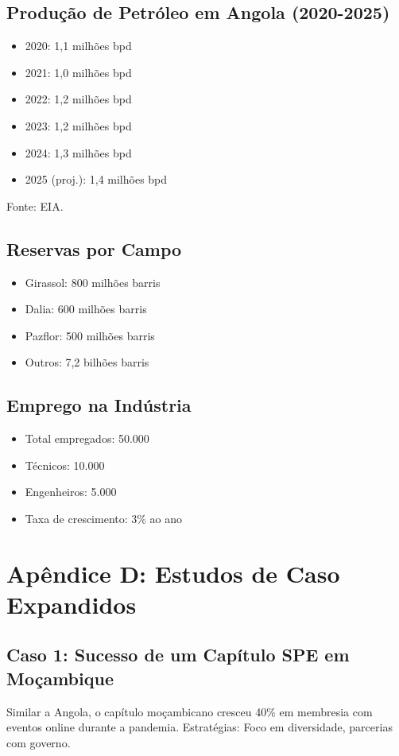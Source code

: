 \documentclass[12pt]{article}
\begin{document}
\subsection{Produção de Petróleo em Angola (2020-2025)}
\begin{itemize}
    \item 2020: 1,1 milhões bpd
    \item 2021: 1,0 milhões bpd
    \item 2022: 1,2 milhões bpd
    \item 2023: 1,2 milhões bpd
    \item 2024: 1,3 milhões bpd
    \item 2025 (proj.): 1,4 milhões bpd
\end{itemize}
Fonte: EIA.

\subsection{Reservas por Campo}
\begin{itemize}
    \item Girassol: 800 milhões barris
    \item Dalia: 600 milhões barris
    \item Pazflor: 500 milhões barris
    \item Outros: 7,2 bilhões barris
\end{itemize}

\subsection{Emprego na Indústria}
\begin{itemize}
    \item Total empregados: 50.000
    \item Técnicos: 10.000
    \item Engenheiros: 5.000
    \item Taxa de crescimento: 3\% ao ano
\end{itemize}

\clearpage
\section{Apêndice D: Estudos de Caso Expandidos}

\subsection{Caso 1: Sucesso de um Capítulo SPE em Moçambique}
Similar a Angola, o capítulo moçambicano cresceu 40\% em membresia com eventos online durante a pandemia. Estratégias: Foco em diversidade, parcerias com governo.
\end{document}
